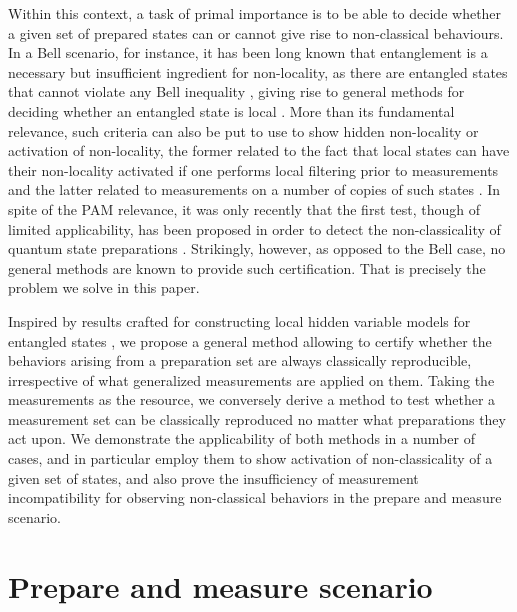\documentclass[a4paper,preprintnumbers,floatfix,superscriptaddress,pra,twocolumn,showpacs,notitlepage,longbibliography]{revtex4-2}
\begin{document}
    Within this context, a task of primal importance is to be able to decide whether a given set of prepared states can or cannot give rise to non-classical behaviours. In a Bell scenario, for instance, it has been long known that entanglement is a necessary but insufficient ingredient for non-locality, as there are entangled states that cannot violate any Bell inequality \cite{werner-quantum-1989, barrett-nonsequential-2002}, giving rise to general methods for deciding whether an entangled state is local \cite{cavalcanti-method-2016,hirsch-method-2016}. More than its fundamental relevance, such criteria can also be put to use to show hidden non-locality or activation of non-locality, the former related to the fact that local states can have their non-locality activated if one performs local filtering prior to measurements \cite{popescu-filtering-1995, hirsch-hidden-2013,gallego2014nonlocality} and the latter related to measurements on a number of copies of such states \cite{navascues-activation-2011, palazuelos-superactivation-2012,cavalcanti2011quantum}. In spite of the PAM relevance, it was only recently that the first test, though of limited applicability, has been proposed in order to detect the non-classicality of quantum state preparations \cite{Poderini2020}. Strikingly, however, as opposed to the Bell case, no general methods are known to provide such certification. That is precisely the problem we solve in this paper.
    
    Inspired by results crafted for constructing local hidden variable models for entangled states \cite{cavalcanti-method-2016, hirsch-method-2016}, we propose a general method allowing to certify whether the behaviors arising from a preparation set are always classically reproducible, irrespective of what generalized measurements are applied on them. Taking the measurements as the resource, we conversely derive a method to test whether a measurement set can be classically reproduced no matter what preparations they act upon. We demonstrate the applicability of both methods in a number of cases, and in particular employ them to show activation of non-classicality of a given set of states, and also prove the insufficiency of measurement incompatibility for observing non-classical behaviors in the prepare and measure scenario.




\section{Prepare and measure scenario}
\end{document}

